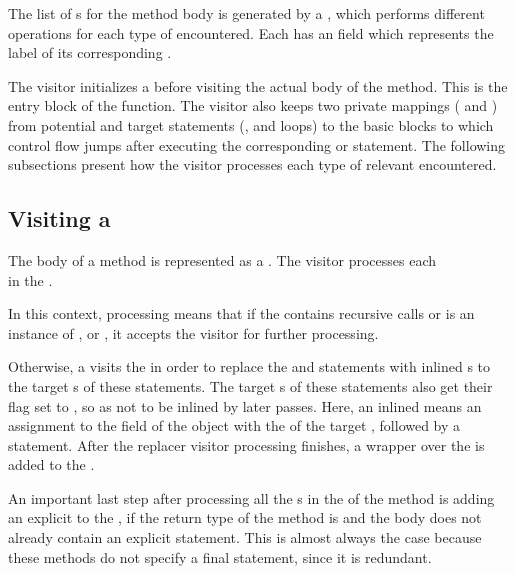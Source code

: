 The list of s for the method body is generated by a , which performs
different operations for each type of  encountered. Each  has an  field which
represents the label of its corresponding .

The visitor initializes a  before visiting the actual body of the method. This is the entry block of
the function. The visitor also keeps two private mappings ( and ) from
potential  and  target statements (,  and  loops) to
the basic blocks to which control flow jumps after executing the corresponding  or  statement.
The following subsections present how the visitor processes each type of relevant  encountered.

\subsection{Visiting a }

The body of a method is represented as a . The visitor processes each\\
 in the .

In this context, processing means that if the  contains recursive calls or is an instance of
,  or ,
it accepts the visitor for further processing.

Otherwise, a  visits the  in order to replace the  and
 statements with inlined s to the target s of these
statements. The target s of these statements also get their  flag set to ,
so as not to be inlined by later passes. Here, an inlined  means an assignment to the
 field of the  object with the  of the target , followed by a 
statement. After the replacer visitor processing finishes, a  wrapper over the
 is added to the .

An important last step after processing all the s in the  of the method is adding
an explicit  to the , if the return type of the method is  and the
body does not already contain an explicit  statement. This is almost always the case because these methods
do not specify a final  statement, since it is redundant.

